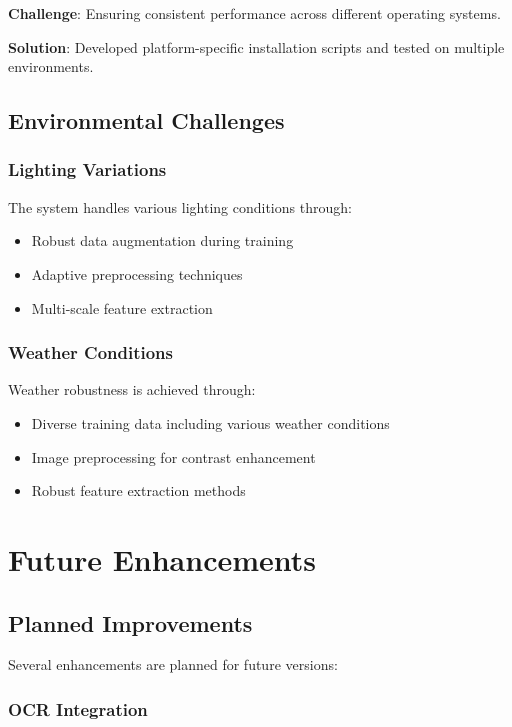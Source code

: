 \documentclass[12pt,a4paper]{article}
\begin{document}
\textbf{Challenge}: Ensuring consistent performance across different operating systems.

\textbf{Solution}: Developed platform-specific installation scripts and tested on multiple environments.

\subsection{Environmental Challenges}

\subsubsection{Lighting Variations}

The system handles various lighting conditions through:

\begin{itemize}
    \item Robust data augmentation during training
    \item Adaptive preprocessing techniques
    \item Multi-scale feature extraction
\end{itemize}

\subsubsection{Weather Conditions}

Weather robustness is achieved through:

\begin{itemize}
    \item Diverse training data including various weather conditions
    \item Image preprocessing for contrast enhancement
    \item Robust feature extraction methods
\end{itemize}

\section{Future Enhancements}

\subsection{Planned Improvements}

Several enhancements are planned for future versions:

\subsubsection{OCR Integration}
\end{document}
